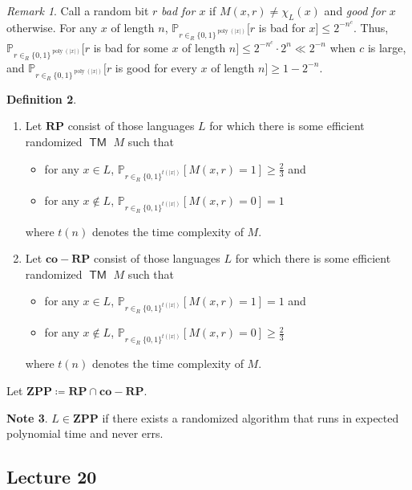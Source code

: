 \documentclass[10pt,letterpaper,cm]{nupset}
\theoremstyle{definition}
\newtheorem{definition}{Definition}[subsection]
\newtheorem{note}[definition]{Note}
\theoremstyle{theorem}
\theoremstyle{remark}
\newtheorem{remark}[definition]{Remark}
\newcommand{\1}{\mathbf{1}}
\newcommand{\0}{\vec 0}
\DeclareMathOperator{\TM}{\mathsf{TM}}
\DeclareMathOperator{\poly}{poly}
\begin{document}
\begin{remark}\label{good}
Call a random bit $r$ \textit{bad for $x$} if $M(x, r) \ne \chi_L(x)$ and \textit{good for $x$} otherwise. For any $x$ of length $n$, $\mathbb{P}_{r\in_R \{0,1\}^{\poly(\lvert{x}\rvert)}}[r$ is bad for $x] \leq 2^{{-}n^c}$. Thus, $\mathbb{P}_{r\in_R \{0,1\}^{\poly(\lvert{x}\rvert)}}[r$ is bad for some $x$ of length $n] \leq 2^{{-}n^c}\cdot 2^n \ll 2^{{-}n}$ when $c$ is large, and $\mathbb{P}_{r\in_R \{0,1\}^{\poly(\lvert{x}\rvert)}}[r$ is good for every $x$ of length $n] \geq 1 - 2^{{-}n}$. 
\end{remark}

\begin{definition} $ $
\begin{enumerate}
\item Let $\mathbf{RP}$ consist of those languages $L$ for which there is some efficient randomized $\TM$ $M$ such that 
\begin{itemize}
\item for any $x\in L$, $\mathbb{P}_{r\in_R \{0,1\}^{t(\lvert{x}\rvert)}}[M(x,r)=1] \geq \frac{2}{3}$ and
\item for any $x\notin L$, $\mathbb{P}_{r\in_R \{0,1\}^{t(\lvert{x}\rvert)}}[M(x,r)=0] = 1$
\end{itemize} where $t(n)$ denotes the time complexity of $M$.
\item Let $\mathbf{co{-}RP}$ consist of those languages $L$ for which there is some efficient randomized $\TM$ $M$ such that 
\begin{itemize}
\item for any $x\in L$, $\mathbb{P}_{r\in_R \{0,1\}^{t(\lvert{x}\rvert)}}[M(x,r)=1]= 1$ and
\item for any $x\notin L$, $\mathbb{P}_{r\in_R \{0,1\}^{t(\lvert{x}\rvert)}}[M(x,r)=0] \geq \frac{2}{3}$
\end{itemize} where $t(n)$ denotes the time complexity of $M$.
\end{enumerate}
Let $\mathbf{ZPP} \coloneqq \mathbf{RP} \cap \mathbf{co{-}RP}$.
\end{definition}

\begin{note}
$L \in \mathbf{ZPP}$ if there exists a randomized algorithm that runs in expected polynomial time and never errs. 
\end{note}

\subsection{Lecture 20}
\end{document}
